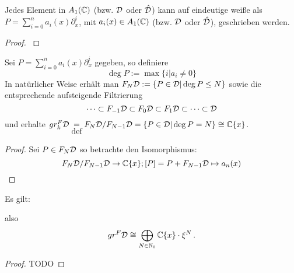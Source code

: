 \begin{prop} \label{prop:weyl_eindeutige_schreibung}
\cite[Proposition 1.2.3]{sabbah_cimpa90}
Jedes Element in $A_1(\mathbb{C})$ (bzw. $\mathcal{D}$ oder $\hat{\mathcal{D}}$) kann auf eindeutige
weiße als $P=\sum_{i=0}^na_i(x)\partial_x^i$, mit $a_i(x)\in A_1(\mathbb{C})$ (bzw.
$\mathcal{D}$ oder $\hat{\mathcal{D}}$), geschrieben werden. 
\end{prop}
\begin{proof}
\cite[Proposition 1.2.3]{sabbah_cimpa90}
\begin{comment}
ein teil des Beweises ist "left as an exersice"
\end{comment}
\end{proof}



\begin{defn}
Sei $P=\sum_{i=0}^na_i(x)\partial_x^i$ gegeben, so definiere 
\[
\deg P:=\max\{i|a_i\neq 0\}
\]
In natürlicher Weise erhält man $F_N\mathcal{D}:=\{P\in\mathcal{D}|\deg P\leq N\}$ sowie die
entsprechende aufsteigende Filtrierung
\[
\cdots\subset F_{-1}\mathcal{D}\subset F_{0}\mathcal{D}\subset
F_{1}\mathcal{D}\subset\cdots\subset\mathcal{D}
\]
und erhalte $gr_k^F\mathcal{D}\underset{\mbox{def}}{=}F_N\mathcal{D}\slash F_{N-1}\mathcal{D}
=\{P\in\mathcal{D}|\deg P=N\}\cong\mathbb{C}\{x\}$.
\end{defn}

\begin{proof}
Sei $P\in F_N\mathcal{D}$ so betrachte den Isomorphismus:
\[
F_N\mathcal{D}\slash F_{N-1}\mathcal{D}\rightarrow \mathbb{C}\{x\}; [P]=P+F_{N-1}\mathcal{D}\mapsto a_n(x)
\]
\end{proof}

\begin{prop}
Es gilt:
\begin{center}
\end{center}
also
\[ gr^F\mathcal{D} \cong \bigoplus_{N\in\mathbb{N}_0}\mathbb{C}\{x\}\cdot \xi^N \,. \]
\end{prop}
\begin{proof} TODO
\begin{comment}
Treffen?
\end{comment}
\end{proof}


